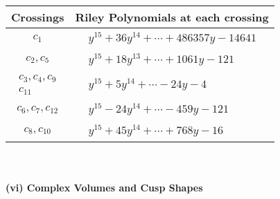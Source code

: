 \documentclass[1p]{elsarticle_modified}
\theoremstyle{definition}
\begin{document}
\begin{tabular}{m{50pt}|m{274pt}}
Crossings & \hspace{64pt}Riley Polynomials at each crossing \\
\hline $$\begin{aligned}c_{1}\end{aligned}$$&$\begin{aligned}
&y^{15}+36 y^{14}+\cdots+486357 y-14641
\end{aligned}$\\
\hline $$\begin{aligned}c_{2},c_{5}\end{aligned}$$&$\begin{aligned}
&y^{15}+18 y^{13}+\cdots+1061 y-121
\end{aligned}$\\
\hline $$\begin{aligned}c_{3},c_{4},c_{9}\\c_{11}\end{aligned}$$&$\begin{aligned}
&y^{15}+5 y^{14}+\cdots-24 y-4
\end{aligned}$\\
\hline $$\begin{aligned}c_{6},c_{7},c_{12}\end{aligned}$$&$\begin{aligned}
&y^{15}-24 y^{14}+\cdots-459 y-121
\end{aligned}$\\
\hline $$\begin{aligned}c_{8},c_{10}\end{aligned}$$&$\begin{aligned}
&y^{15}+45 y^{14}+\cdots+768 y-16
\end{aligned}$\\
\hline
\end{tabular}\\~\\
\newpage\flushleft \textbf{(vi) Complex Volumes and Cusp Shapes}
\end{document}
